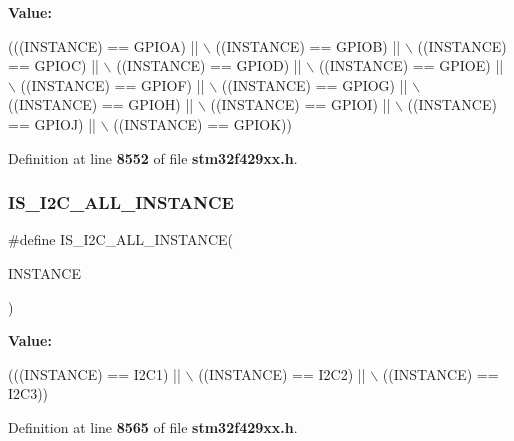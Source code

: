 {\bfseries Value\+:}
\begin{DoxyCode}
(((INSTANCE) == GPIOA) || \(\backslash\)
                                        ((INSTANCE) == GPIOB) || \(\backslash\)
                                        ((INSTANCE) == GPIOC) || \(\backslash\)
                                        ((INSTANCE) == GPIOD) || \(\backslash\)
                                        ((INSTANCE) == GPIOE) || \(\backslash\)
                                        ((INSTANCE) == GPIOF) || \(\backslash\)
                                        ((INSTANCE) == GPIOG) || \(\backslash\)
                                        ((INSTANCE) == GPIOH) || \(\backslash\)
                                        ((INSTANCE) == GPIOI) || \(\backslash\)
                                        ((INSTANCE) == GPIOJ) || \(\backslash\)
                                        ((INSTANCE) == GPIOK))
\end{DoxyCode}


Definition at line \textbf{ 8552} of file \textbf{ stm32f429xx.\+h}.

\mbox{\label{group__Exported__macros_gacdf0149a4e8c41a6814c13613c38a6b2}} 
\subsubsection{I\+S\+\_\+\+I2\+C\+\_\+\+A\+L\+L\+\_\+\+I\+N\+S\+T\+A\+N\+CE}
{\footnotesize\ttfamily \#define I\+S\+\_\+\+I2\+C\+\_\+\+A\+L\+L\+\_\+\+I\+N\+S\+T\+A\+N\+CE(\begin{DoxyParamCaption}\item[{}]{I\+N\+S\+T\+A\+N\+CE }\end{DoxyParamCaption})}

{\bfseries Value\+:}
\begin{DoxyCode}
(((INSTANCE) == I2C1) || \(\backslash\)
                                       ((INSTANCE) == I2C2) || \(\backslash\)
                                       ((INSTANCE) == I2C3))
\end{DoxyCode}


Definition at line \textbf{ 8565} of file \textbf{ stm32f429xx.\+h}.

\mbox{\label{group__Exported__macros_gadfab0fe964af4c2d5caa13ce8ec31524}} 

